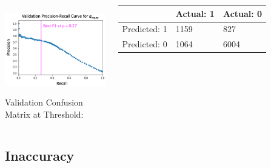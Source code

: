 \documentclass[11pt,
               aspectratio=169,
               hyperref={colorlinks}
               ]{beamer}
\begin{document}
\begin{frame}
\begin{columns}
						\vspace{20pt}
							\centering
							\includegraphics[height=110pt]{../img/pr_auc.png}\\
							\tiny
							\vspace{5pt}
							Validation Confusion Matrix at Threshold:\vspace{-7pt}
							\begin{table}
								\hspace{7pt}
								\begin{tabular}{ | p{1.3cm} | p{1cm} | p{1.3cm} | }
									\hline
								 	& Actual: 1 & Actual: 0 \\ 
									\hline
									Predicted: 1 & 1159	& 827 \\
									\hline
									Predicted: 0 & 1064	& 6004 \\
									\hline
								\end{tabular}	
							\end{table}	
						\normalsize
				
					\end{columns}
							
			\end{frame}

		\subsection{Inaccuracy}
\end{document}
